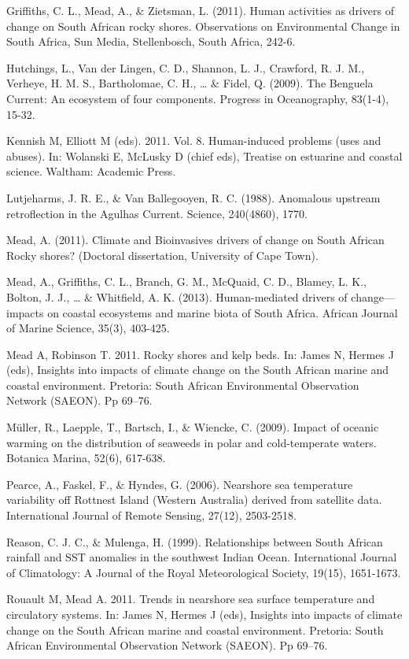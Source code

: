 \documentclass[12pt,]{article}
\begin{document}
Griffiths, C. L., Mead, A., \& Zietsman, L. (2011). Human activities as
drivers of change on South African rocky shores. Observations on
Environmental Change in South Africa, Sun Media, Stellenbosch, South
Africa, 242-6.

Hutchings, L., Van der Lingen, C. D., Shannon, L. J., Crawford, R. J.
M., Verheye, H. M. S., Bartholomae, C. H., \ldots{} \& Fidel, Q. (2009).
The Benguela Current: An ecosystem of four components. Progress in
Oceanography, 83(1-4), 15-32.

Kennish M, Elliott M (eds). 2011. Vol. 8. Human-induced problems (uses
and abuses). In: Wolanski E, McLusky D (chief eds), Treatise on
estuarine and coastal science. Waltham: Academic Press.

Lutjeharms, J. R. E., \& Van Ballegooyen, R. C. (1988). Anomalous
upstream retroflection in the Agulhas Current. Science, 240(4860), 1770.

Mead, A. (2011). Climate and Bioinvasives drivers of change on South
African Rocky shores? (Doctoral dissertation, University of Cape Town).

Mead, A., Griffiths, C. L., Branch, G. M., McQuaid, C. D., Blamey, L.
K., Bolton, J. J., \ldots{} \& Whitfield, A. K. (2013). Human-mediated
drivers of change---impacts on coastal ecosystems and marine biota of
South Africa. African Journal of Marine Science, 35(3), 403-425.

Mead A, Robinson T. 2011. Rocky shores and kelp beds. In: James N,
Hermes J (eds), Insights into impacts of climate change on the South
African marine and coastal environment. Pretoria: South African
Environmental Observation Network (SAEON). Pp 69--76.

Müller, R., Laepple, T., Bartsch, I., \& Wiencke, C. (2009). Impact of
oceanic warming on the distribution of seaweeds in polar and
cold-temperate waters. Botanica Marina, 52(6), 617-638.

Pearce, A., Faskel, F., \& Hyndes, G. (2006). Nearshore sea temperature
variability off Rottnest Island (Western Australia) derived from
satellite data. International Journal of Remote Sensing, 27(12),
2503-2518.

Reason, C. J. C., \& Mulenga, H. (1999). Relationships between South
African rainfall and SST anomalies in the southwest Indian Ocean.
International Journal of Climatology: A Journal of the Royal
Meteorological Society, 19(15), 1651-1673.

Rouault M, Mead A. 2011. Trends in nearshore sea surface temperature and
circulatory systems. In: James N, Hermes J (eds), Insights into impacts
of climate change on the South African marine and coastal environment.
Pretoria: South African Environmental Observation Network (SAEON). Pp
69--76.
\end{document}
